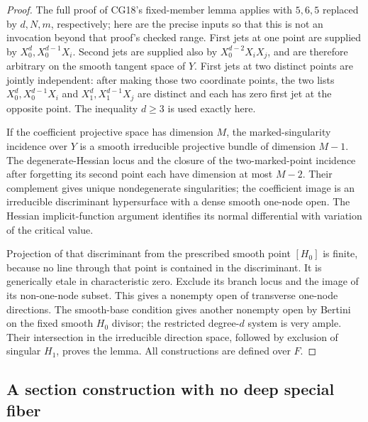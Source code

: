 \begin{proof}
The full proof of CG18's fixed-member lemma applies with
$5,6,5$ replaced by $d,N,m$, respectively; here are the
precise inputs so that this is not an invocation beyond
that proof's checked range.
First jets at one point are supplied by
$X_0^d,X_0^{d-1}X_i$.  Second jets are supplied also by
$X_0^{d-2}X_iX_j$, and are therefore arbitrary on the
smooth tangent space of $Y$.  First jets at two distinct
points are jointly independent: after making those two
coordinate points, the two lists
$X_0^d,X_0^{d-1}X_i$ and
$X_1^d,X_1^{d-1}X_j$ are distinct and each has zero
first jet at the opposite point.  The inequality $d\ge3$
is used exactly here.

If the coefficient projective space has dimension $M$,
the marked-singularity incidence over $Y$ is a smooth
irreducible projective bundle of dimension $M-1$.
The degenerate-Hessian locus and the closure of the
two-marked-point incidence after forgetting its second
point each have dimension at most $M-2$.  Their
complement gives unique nondegenerate singularities;
the coefficient image is an irreducible discriminant
hypersurface with a dense smooth one-node open.
The Hessian implicit-function argument identifies its
normal differential with variation of the critical value.

Projection of that discriminant from the prescribed
smooth point $[H_0]$ is finite, because no line through
that point is contained in the discriminant.  It is
generically etale in characteristic zero.  Exclude its
branch locus and the image of its non-one-node subset.
This gives a nonempty open of transverse one-node
directions.  The smooth-base condition gives another
nonempty open by Bertini on the fixed smooth $H_0$
divisor; the restricted degree-$d$ system is very ample.
Their intersection in the irreducible direction space,
followed by exclusion of singular $H_1$, proves the lemma.
All constructions are defined over $F$.
\end{proof}

\subsection{A section construction with no deep special fiber}

